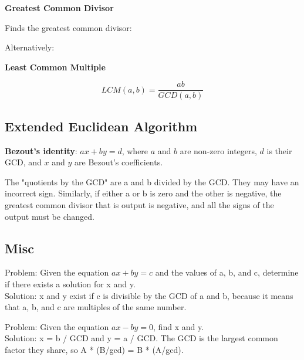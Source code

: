 
\textbf{Greatest Common Divisor}

Finds the greatest common divisor:



Alternatively:



\textbf{Least Common Multiple}

$$LCM(a, b) = \frac{ab}{GCD(a, b)}$$

\subsection*{Extended Euclidean Algorithm}

\textbf{Bezout's identity}: $ax + by = d$, where $a$ and $b$ are non-zero integers, $d$ is their GCD, and $x$ and $y$ are Bezout's coefficients.



The "quotients by the GCD" are a and b divided by the GCD. They may have an incorrect sign. Similarly, if either a or b is zero and the other is negative, the greatest common divisor that is output is negative, and all the signs of the output must be changed.

\subsection*{Misc}

Problem: Given the equation $ax + by = c$ and the values of a, b, and c, determine if there exists a solution for x and y. \\
\indent Solution: x and y exist if c is divisible by the GCD of a and b, because it means that a, b, and c are multiples of the same number.

Problem: Given the equation $ax - by = 0$, find x and y. \\
\indent Solution: x = b / GCD and y = a / GCD. The GCD is the largest common factor they share, so A * (B/gcd) = B * (A/gcd).

\newpage